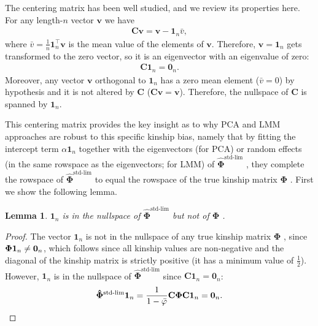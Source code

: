 \documentclass[11pt]{article}
\newcommand{\kinMat}{%
  \ensuremath{%
    \mathbf{\Phi}
  }%
  \xspace%
}%
\newcommand{\kinMatStdLim}{%
  \ensuremath{%
    \mathbf{\hat{\Phi}}^\text{std-lim}
  }%
  \xspace%
}%
\newtheorem*{lem}{Lemma}
\begin{document}
The centering matrix has been well studied, and we review its properties here.
For any length-$n$ vector $\mathbf{v}$ we have
\begin{align*}
  \mathbf{C} \mathbf{v}
  =
  \mathbf{v} - \mathbf{1}_n \bar{v}
  ,
\end{align*}
where $\bar{v} = \frac{1}{n} \mathbf{1}_n^\intercal \mathbf{v}$ is the mean value of the elements of $\mathbf{v}$.
Therefore, $\mathbf{v} = \mathbf{1}_n$ gets transformed to the zero vector, so it is an eigenvector with an eigenvalue of zero:
\begin{align*}
  \mathbf{C} \mathbf{1}_n
  =
  \mathbf{0}_n
  .
\end{align*}
Moreover, any vector $\mathbf{v}$ orthogonal to $\mathbf{1}_n$ has a zero mean element ($\bar{v} = 0$) by hypothesis and it is not altered by $\mathbf{C}$ ($\mathbf{C} \mathbf{v} = \mathbf{v}$).
Therefore, the nullspace of $\mathbf{C}$ is spanned by $\mathbf{1}_n$.

This centering matrix provides the key insight as to why PCA and LMM approaches are robust to this specific kinship bias, namely that by fitting the intercept term $\alpha \mathbf{1}_n$ together with the eigenvectors (for PCA) or random effects (in the same rowspace as the eigenvectors; for LMM) of \kinMatStdLim, they complete the rowspace of \kinMatStdLim to equal the rowspace of the true kinship matrix \kinMat.
First we show the following lemma.

\begin{lem}
  $\mathbf{1}_n$ is in the nullspace of \kinMatStdLim but not of \kinMat.
\end{lem}

\begin{proof}
The vector $\mathbf{1}_n$ is not in the nullspace of any true kinship matrix \kinMat, since $\kinMat \mathbf{1}_n \neq \mathbf{0}_n$, which follows since all kinship values are non-negative and the diagonal of the kinship matrix is strictly positive (it has a minimum value of $\frac{1}{2}$).
However, $\mathbf{1}_n$ is in the nullspace of \kinMatStdLim since $\mathbf{C} \mathbf{1}_n = \mathbf{0}_n$:
$$
\kinMatStdLim \mathbf{1}_n
=
\frac{1}{1 - \bar{\varphi}}
\mathbf{C} \kinMat \mathbf{C} \mathbf{1}_n
=
\mathbf{0}_n
.
$$
\end{proof}
\end{document}
